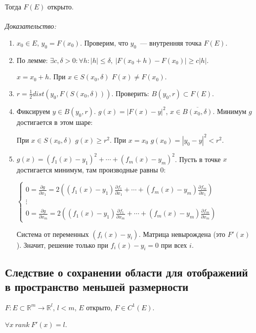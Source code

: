 \documentclass[paper=a4, fontsize=11pt]{article}
\begin{document}
Тогда $F(E)$ открыто.
\\\\
\emph{Доказательство:}
\begin{enumerate}
    \item $x_0 \in E$, $y_0 = F(x_0)$. Проверим, что $y_0$~--- внутренняя точка $F(E)$.
    \item По лемме: $\exists c,\delta>0: \forall h: |h| \leq \delta,\ |F(x_0+h)-F(x_0)| \geq c|h|$.

    $x = x_0+h$. При $x \in S(x_0, \delta)$ $F(x) \neq F(x_0)$.
    \item $r = \frac{1}{2} dist(y_0,F(S(x_0,\delta)))$.
    Проверить: $B(y_0,r) \subset F(E)$.
    \item Фиксируем $y \in B(y_0,r)$. $g(x) = |F(x)-y|^2$, $x \in \overline{B(x_0,\delta)}$.
    Минимум $g$ достигается в этом шаре:

    При $x \in S(x_0,\delta)$ $g(x) \geq r^2$. При $x=x_0$ $g(x_0) = |y_0-y|^2 < r^2$.

    \item $g(x) = (f_1(x)-y_1)^2 + \cdots + (f_m(x)-y_m)^2$. Пусть в точке $x$ достигается минимум, там производные равны $0$:

    $
    \begin{cases}
        0 = \frac{\partial g}{\partial x_1} = 2((f_1(x)-y_1) \frac{\partial f_1}{\partial x_1} +
        \cdots + (f_m(x)-y_m) \frac{\partial f_m}{\partial x_1})\\
        \vdots\\
        0 = \frac{\partial g}{\partial x_m} = 2((f_1(x)-y_1) \frac{\partial f_1}{\partial x_m} +
        \cdots + (f_m(x)-y_m) \frac{\partial f_m}{\partial x_m})
    \end{cases}
    $

    Система от переменных $(f_i(x) - y_i)$. Матрица невырождена (это $F'(x)$). Значит, решение только при $f_i(x) - y_i = 0$
    при всех $i$.
\end{enumerate}

\subsection{Следствие о сохранении области для отображений в пространство меньшей размерности}
$F: E \subset \mathds{R}^m \rightarrow \mathds{R}^l$, $l < m$, $E$ открыто, $F \in C^1(E)$.

$\forall x\ rank\ F'(x)=l$.
\end{document}

